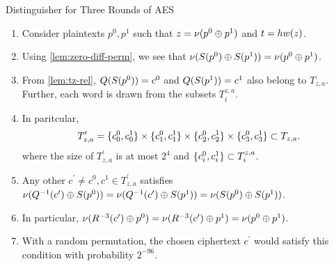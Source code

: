 \documentclass[notheorems]{beamer}
\theoremstyle{definition}
\theoremstyle{example}
\begin{document}
    \begin{frame}[<+->]{Distinguisher for Three Rounds of AES}
        \begin{enumerate}
            \item Consider plaintexts \(p^0, p^1\) such that \(z = \nu(p^0
            \oplus p^1)\) and \(t = hw(z)\). 
            \item Using \cref{lem:zero-diff-perm}, we see that
            \(\nu(S(p^0) \oplus S(p^1)) = \nu(p^0 \oplus
            p^1)\). 
            \item From \cref{lem:tz-rel}, \(Q(S(p^0)) = c^0\) and
            \(Q(S(p^1)) = c^1\) also belong to \(T_{z, a}\). Further,
            each word is drawn from the subsets \(T_i^{z, a}\). 
            \item In paritcular,
            \begin{equation}
                T_{z, a}^\prime = \{c_0^0, c_0^1\} \times \{c_1^0, c_1^1\} \times \{c_2^0, c_2^1\} \times \{c_3^0, c_3^1\} \subset T_{z, a}.
            \end{equation}
            where the size of \(T_{z, a}^\prime\) is at most \(2^4\) and
            \(\{c_i^0, c_i^1\} \subset T_i^{z, a}\). 
            \item Any other \(c^\prime \ne c^0, c^1 \in T_{z, a}^\prime\)
            satisfies \(\nu(Q^{-1}(c^\prime) \oplus S(p^0)) =
            \nu(Q^{-1}(c^\prime) \oplus S(p^1)) =
            \nu(S(p^0) \oplus S(p^1))\). 
            \item In particular, \(\nu(R^{-3}(c^\prime) \oplus p^0) =
            \nu(R^{-3}(c^\prime) \oplus p^1) = \nu(p^0 \oplus
            p^1)\). 
            \item With a random permutation, the chosen ciphertext \(c^\prime\)
            would satisfy this condition with probability \(2^{-96}\).
        \end{enumerate}        
    \end{frame}
\end{document}
